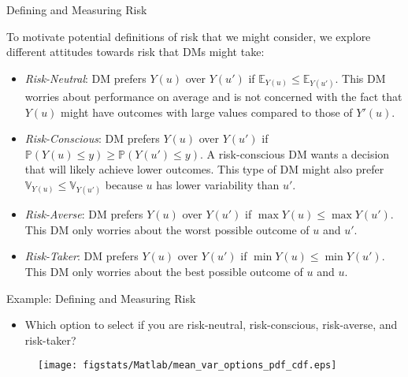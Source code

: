 \documentclass[9pt]{beamer}
\begin{document}
%
\begin{frame}{Defining and Measuring Risk}

To motivate potential definitions of risk that we might consider, we explore different attitudes towards risk that DMs might take: 

\begin{block}{}
\begin{itemize}
\item {\em Risk-Neutral}: DM prefers $Y(u)$ over $Y(u')$ if $\mathbb{E}_{Y(u)}\leq \mathbb{E}_{Y(u')}$.  This DM worries about performance on average and is not concerned with the fact that $Y(u)$ might have outcomes with large values compared to those of $Y'(u)$. 

\item {\em Risk-Conscious}: DM prefers $Y(u)$ over $Y(u')$ if $\mathbb{P}(Y(u)\leq y)\geq \mathbb{P}(Y(u')\leq y)$.  A risk-conscious DM wants a decision that will likely achieve lower outcomes. This type of DM might also prefer $\mathbb{V}_{Y(u)}\leq \mathbb{V}_{Y(u')}$ because $u$ has lower variability than $u'$.

\item {\em Risk-Averse}: DM prefers $Y(u)$ over $Y(u')$ if $\max  Y(u)\leq \max Y(u')$.  This DM only worries about the worst possible outcome of $u$ and $u'$.

\item {\em Risk-Taker}: DM prefers $Y(u)$ over $Y(u')$ if $\min Y(u)\leq \min Y(u')$.  This DM only worries about the best possible outcome of $u$ and $u$.

\end{itemize}
\end{block}


\end{frame}

%
\begin{frame}{Example: Defining and Measuring Risk}
\begin{itemize}
\item Which option to select if you are risk-neutral, risk-conscious, risk-averse, and risk-taker?
\end{itemize}
\begin{figure}[!htb]
    \centering
	\texttt{[image: figstats/Matlab/mean\_var\_options\_pdf\_cdf.eps]}
\end{figure}

\end{frame}
\end{document}
